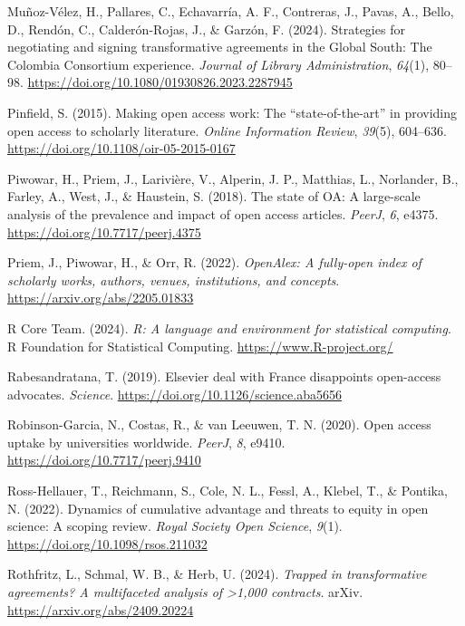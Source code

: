 \documentclass[a4paper,man,floatsintext,longtable,noextraspace,10pt]{apa6}
\newlength{\cslhangindent}
\newenvironment{CSLReferences}[2] %
{\begin{list}{}{%
  \setlength{\itemindent}{0pt}
  \setlength{\leftmargin}{0pt}
  \setlength{\parsep}{0pt}
  \ifodd #1
  \setlength{\leftmargin}{\cslhangindent}
  \setlength{\itemindent}{-1\cslhangindent}
  \fi
  \setlength{\itemsep}{#2\baselineskip}}}
{\end{list}}
\begin{document}
\begin{CSLReferences}{1}{0}
Muñoz-Vélez, H., Pallares, C., Echavarría, A. F., Contreras, J., Pavas,
A., Bello, D., Rendón, C., Calderón-Rojas, J., \& Garzón, F. (2024).
Strategies for negotiating and signing transformative agreements in the
{Global South}: The {Colombia Consortium} experience. \emph{Journal of
Library Administration}, \emph{64}(1), 80--98.
\url{https://doi.org/10.1080/01930826.2023.2287945}

Pinfield, S. (2015). Making open access work: The {``state-of-the-art''}
in providing open access to scholarly literature. \emph{Online
Information Review}, \emph{39}(5), 604--636.
\url{https://doi.org/10.1108/oir-05-2015-0167}

Piwowar, H., Priem, J., Larivière, V., Alperin, J. P., Matthias, L.,
Norlander, B., Farley, A., West, J., \& Haustein, S. (2018). The state
of {OA}: A large-scale analysis of the prevalence and impact of open
access articles. \emph{{PeerJ}}, \emph{6}, e4375.
\url{https://doi.org/10.7717/peerj.4375}

Priem, J., Piwowar, H., \& Orr, R. (2022). \emph{OpenAlex: A fully-open
index of scholarly works, authors, venues, institutions, and concepts}.
\url{https://arxiv.org/abs/2205.01833}

R Core Team. (2024). \emph{R: A language and environment for statistical
computing}. R Foundation for Statistical Computing.
\url{https://www.R-project.org/}

Rabesandratana, T. (2019). Elsevier deal with {France} disappoints
open-access advocates. \emph{Science}.
\url{https://doi.org/10.1126/science.aba5656}

Robinson-Garcia, N., Costas, R., \& van Leeuwen, T. N. (2020). Open
access uptake by universities worldwide. \emph{{PeerJ}}, \emph{8},
e9410. \url{https://doi.org/10.7717/peerj.9410}

Ross-Hellauer, T., Reichmann, S., Cole, N. L., Fessl, A., Klebel, T., \&
Pontika, N. (2022). Dynamics of cumulative advantage and threats to
equity in open science: A scoping review. \emph{Royal Society Open
Science}, \emph{9}(1). \url{https://doi.org/10.1098/rsos.211032}

Rothfritz, L., Schmal, W. B., \& Herb, U. (2024). \emph{Trapped in
transformative agreements? A multifaceted analysis of \textgreater1,000
contracts}. arXiv. \url{https://arxiv.org/abs/2409.20224}


\end{CSLReferences}
\end{document}
